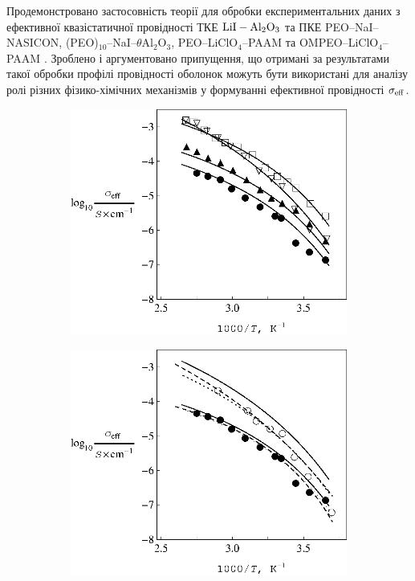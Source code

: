 \documentclass[14pt,twoside]{vakthesis}
\begin{document}
Продемонстровано застосовність теорії для обробки експериментальних даних з ефективної квазістатичної провідності ТКЕ $\rm LiI-Al_2O_3$ \cite{Liang1973} та ПКЕ PEO--NaI--NASICON,  (PEO)$_{10}$--NaI--$\theta$Al$_2$O$_3$, PEO--LiClO$_4$--PAAM та OMPEO--LiClO$_4$--PAAM \cite{Przl1995, Wiec1994}. 
Зроблено і аргументовано припущення, що отримані за результатами такої обробки профілі провідності оболонок можуть бути використані для аналізу ролі різних фізико-хімічних механізмів у формуванні ефективної провідності  $\sigma_{\rm eff}$.

\begin{figure}[tb]
	\centering
	\begin{subfigure}[c]{0.48\textwidth}
		\includegraphics[width=\textwidth]{Fig8_TemperatureDependence_1.eps}
		\caption{} \label{fig:OMPEO-LiClO4-TempDependence-a}
	\end{subfigure}
	\quad
	\begin{subfigure}[c]{0.48\textwidth}
		\includegraphics[width=\textwidth]{Fig8_TemperatureDependence_2.eps}

\end{subfigure}
\end{figure}
\end{document}
